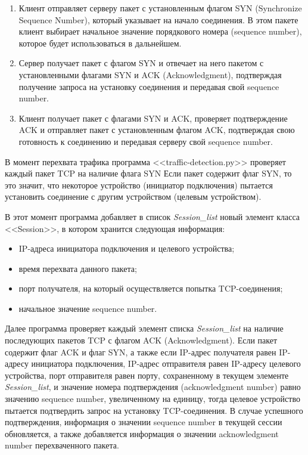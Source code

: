 \documentclass[bachelor, och, coursework]{SCWorks}
\begin{document}
\begin{enumerate}
  \item Клиент отправляет серверу пакет с установленным флагом SYN (Synchronize Sequence Number), который указывает на начало соединения. В этом 
  пакете клиент выбирает начальное значение порядкового номера (sequence number), которое будет использоваться в дальнейшем.
  \item Сервер получает пакет с флагом SYN и отвечает на него пакетом с установленными флагами SYN и ACK (Acknowledgment), подтверждая получение 
  запроса на установку соединения и передавая свой sequence number.
  \item Клиент получает пакет с флагами SYN и ACK, проверяет подтверждение ACK и отправляет пакет с установленным флагом ACK, подтверждая свою 
  готовность к соединению и передавая серверу свой sequence number.
\end{enumerate}

В момент перехвата трафика программа <<traffic-detection.py>> проверяет каждый пакет TCP на наличие флага SYN 
Если пакет содержит флаг SYN, то это значит, что некоторое устройство (инициатор подключения) пытается установить соединение с другим устройством
(целевым устройством). 

В этот момент программа добавляет в 
список \textit{Session\_list} новый элемент класса <<Session>>, в котором хранится следующая информация:


\begin{itemize}
  \item IP-адреса инициатора подключения и целевого устройства;
  \item время перехвата данного пакета;
  \item порт получателя, на который осуществляется попытка TCP-соединения;
  \item начальное значение sequence number. 
\end{itemize}


Далее программа проверяет каждый элемент списка \textit{Session\_list} на наличие последующих пакетов TCP с флагом ACK (Acknowledgment). 
Если пакет содержит флаг ACK и флаг SYN, а также если IP-адрес получателя равен IP-адресу инициатора подключения, IP-адрес отправителя 
равен IP-адресу целевого устройства, порт отправителя равен порту, сохраненному в текущем элементе \textit{Session\_list}, и значение 
номера подтверждения (acknowledgment number) равно значению sequence number, увеличенному на единицу, тогда целевое устройство 
пытается подтвердить запрос на 
установку TCP-соединения. В случае успешного подтверждения, информация о значении sequence number в текущей сессии обновляется, а также 
добавляется информация о значении acknowledgment number перехваченного пакета.
\end{document}

